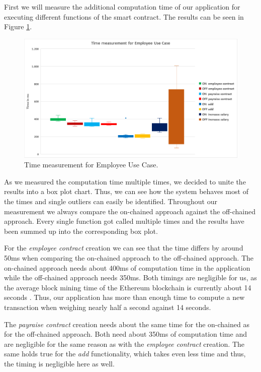First we will measure the additional computation time of our application for executing different functions of the smart contract.
The results can be seen in Figure \ref{fig:05_time}.

\begin{figure}[t]
	\centering
	\includegraphics[width=1.0\textwidth]{images/05_evaluation/05_time.png}
	\caption{\label{fig:05_time}Time measurement for Employee Use Case.}
\end{figure}

As we measured the computation time multiple times, we decided to unite the results into a box plot chart.
Thus, we can see how the system behaves most of the times and single outliers can easily be identified.
Throughout our measurement we always compare the on-chained approach against the off-chained approach.
Every single function got called multiple times and the results have been summed up into the corresponding box plot.

For the \textit{employee contract} creation we can see that the time differs by around 50ms when comparing the on-chained approach to the off-chained approach.
The on-chained approach needs about 400ms of computation time in the application while the off-chained approach needs 350ms.
Both timings are negligible for us, as the average block mining time of the Ethereum blockchain is currently about 14 seconds \cite{etherscan_blocktime}.
Thus, our application has more than enough time to compute a new transaction when weighing nearly half a second against 14 seconds.

The \textit{payraise contract} creation needs about the same time for the on-chained as for the off-chained approach.
Both need about 350ms of computation time and are negligible for the same reason as with the \textit{employee contract} creation.
The same holds true for the \textit{add} functionality, which takes even less time and thus, the timing is negligible here as well.

